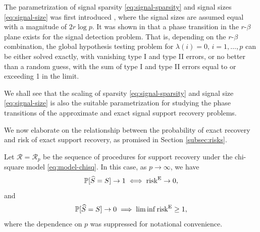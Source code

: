 \begin{remark}
The parametrization of signal sparsity \eqref{eq:signal-sparsity} and signal sizes  \eqref{eq:signal-size} was first introduced \citet{donoho2004higher}, where the signal sizes are assumed equal with a magnitude of $2{r}\log{p}$.
It was shown in \cite{donoho2004higher} that a phase transition in the $r$-$\beta$ plane exists for the signal detection problem. 
That is, depending on the $r$-$\beta$ combination, the global hypothesis testing problem for $\lambda(i)=0,\,i=1,\ldots,p$ can be either solved exactly, with vanishing type I and type II errors, or no better than a random guess, with the sum of type I and type II errors equal to or exceeding 1 in the limit.

We shall see that the scaling of sparsity \eqref{eq:signal-sparsity} and signal size \eqref{eq:signal-size} is also the suitable parametrization for studying the phase transitions of the approximate and exact signal support recovery problems.
\end{remark}

We now elaborate on the relationship between the probability of exact recovery and risk of exact support recovery, as promised in Section \ref{subsec:risks}.
\begin{lemma} \label{lemma:risk-exact-recovery-probability}
Let $\mathcal{R} = \mathcal{R}_p$ be the sequence of procedures for support recovery under the chi-square model \eqref{eq:model-chisq}. 
In this case, as $p\to\infty$, we have
\begin{equation} \label{eq:exact-recovery-implies-risk-0}
    \P[\widehat{S} = S] \to 1 \iff \mathrm{risk}^{\mathrm{E}}\to0,
\end{equation}
and
\begin{equation} \label{eq:failure-recovery-implies-risk-1}
    \P[\widehat{S} = S] \to 0 \implies \liminf\mathrm{risk}^{\mathrm{E}}\ge1,
\end{equation}
where the dependence on $p$ was suppressed for notational convenience.
\end{lemma}

